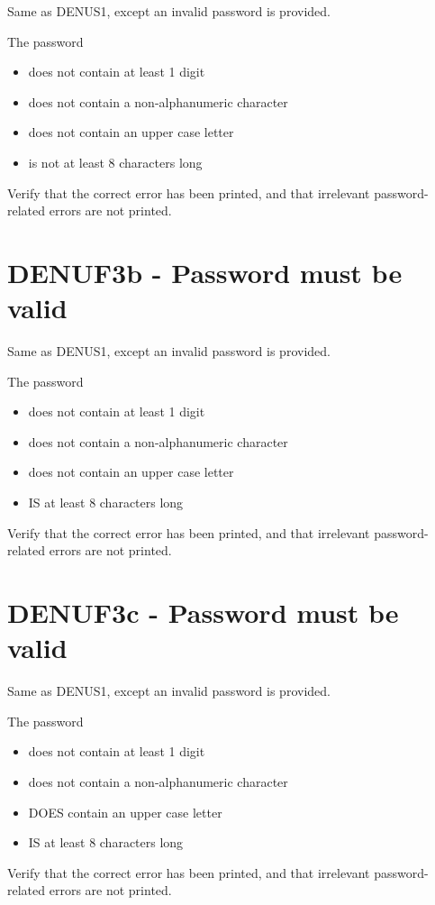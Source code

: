 \documentclass{article}
\begin{document}
Same as DENUS1, except an invalid password is provided.

The password 
\begin{itemize}
 \item does not contain at least 1 digit
 \item does not contain a non-alphanumeric character
 \item does not contain an upper case letter
 \item is not at least 8 characters long
\end{itemize}

Verify that the correct error has been printed, and that
irrelevant password-related errors are not printed.

\section*{DENUF3b - Password must be valid}

Same as DENUS1, except an invalid password is provided.

The password
\begin{itemize}
  \item does not contain at least 1 digit
  \item does not contain a non-alphanumeric character
  \item does not contain an upper case letter
  \item IS at least 8 characters long
\end{itemize}

Verify that the correct error has been printed, and that
irrelevant password-related errors are not printed.

\section*{DENUF3c - Password must be valid}

Same as DENUS1, except an invalid password is provided.

The password
\begin{itemize}
  \item does not contain at least 1 digit
  \item does not contain a non-alphanumeric character
  \item DOES contain an upper case letter
  \item IS at least 8 characters long
\end{itemize}

Verify that the correct error has been printed, and that
irrelevant password-related errors are not printed.
\end{document}
